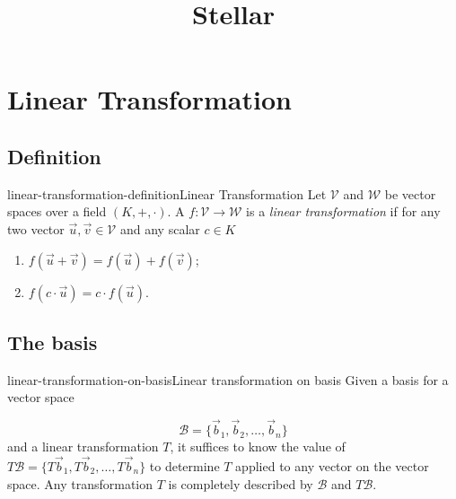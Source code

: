 \documentclass[preview]{standalone}
\begin{document}
\title{Stellar}
\genpage

\section{Linear Transformation}

\subsection{Definition}

\begin{snippetdefinition}{linear-transformation-definition}{Linear Transformation}
    Let \(\mathcal{V}\) and \(\mathcal{W}\) be vector spaces over a field \((K, +, \cdot)\).
    A \function \(f \colon \mathcal{V} \to \mathcal{W}\) is a
    \textit{linear transformation} if for any two vector \(\vec{u}, \vec{v} \in \mathcal{V}\)
    and any scalar \(c\in K\)
    \begin{enumerate}
        \item \(f(\vec{u} + \vec{v}) = f(\vec{u}) + f(\vec{v})\);
        \item \(f(c\cdot\vec{u}) = c\cdot f(\vec{u})\).
    \end{enumerate}
\end{snippetdefinition}

\subsection{The basis}


\begin{snippettheorem}{linear-transformation-on-basis}{Linear transformation on basis}
    Given a basis for a vector space

    \[
        \mathcal{B}=\{\vec{b}_1, \vec{b}_2, \ldots, \vec{b}_n\}
    \]
    and a linear transformation \(T\), it suffices
    to know the value of \(T\mathcal{B}=\{T\vec{b}_1, T\vec{b}_2, \ldots, T\vec{b}_n\}\)
    to determine \(T\) applied to any vector on the vector space.
    Any transformation \(T\) is completely described by \(\mathcal{B}\)
    and \(T\mathcal{B}\).
\end{snippettheorem}
\end{document}
